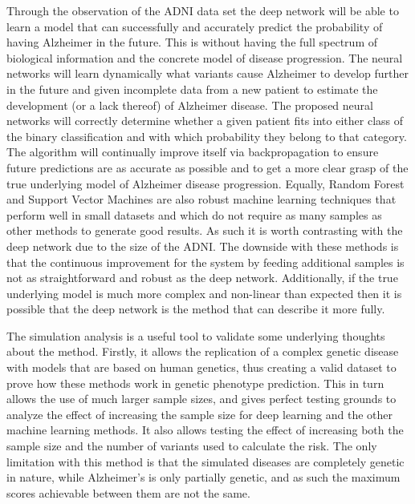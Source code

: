 Through the observation of the ADNI data set the deep network will be able to learn a model that can successfully and accurately predict the probability of having Alzheimer in the future. This is without having the full spectrum of biological information and the concrete model of disease progression. The neural networks will learn dynamically what variants cause Alzheimer to develop further in the future and given incomplete data from a new patient to estimate the development (or a lack thereof) of Alzheimer disease. The proposed neural networks will correctly determine whether a given patient fits into either class of the binary classification and with which probability they belong to that category. The algorithm will continually improve itself via backpropagation to ensure future predictions are as accurate as possible and to get a more clear grasp of the true underlying model of Alzheimer disease progression. 
\newpage
Equally, Random Forest and Support Vector Machines are also robust machine learning techniques that perform well in small datasets and which do not require as many samples as other methods to generate good results. As such it is worth contrasting with the deep network due to the size of the ADNI. The downside with these methods is that the continuous improvement for the system by feeding additional samples is not as straightforward and robust as the deep network. Additionally, if the true underlying model is much more complex and non-linear than expected then it is possible that the deep network is the method that can describe it more fully.

The simulation analysis is a useful tool to validate some underlying thoughts about the method. Firstly, it allows the replication of a complex genetic disease with models that are based on human genetics, thus creating a valid dataset to prove how these methods work in genetic phenotype prediction. This in turn allows the use of much larger sample sizes, and gives perfect testing grounds to analyze the effect of increasing the sample size for deep learning and the other machine learning methods. It also allows testing the effect of increasing both the sample size and the number of variants used to calculate the risk. The only limitation with this method is that the simulated diseases are completely genetic in nature, while Alzheimer's is only partially genetic, and as such the maximum scores achievable between them are not the same.

